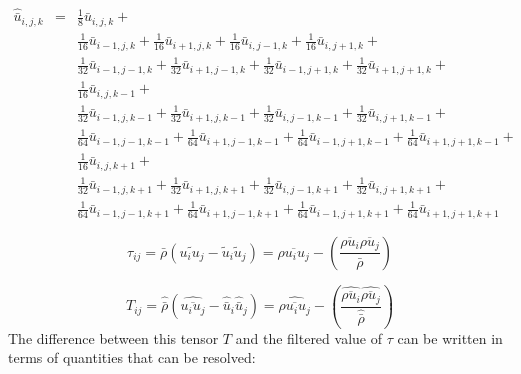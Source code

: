 \documentclass[12pt,titlepage]{article}
\begin{document}
{\setlength\arraycolsep{2pt}
\begin{eqnarray}
\hat{\bar{u}}_{i,j,k} & = & \frac{1}{8} \bar{u}_{i  ,j  ,k  }+{} \nonumber\\
              & & {}    \frac{1}{16}\bar{u}_{i-1,j  ,k  }+\frac{1}{16}\bar{u}_{i+1,j,  k  } +
                        \frac{1}{16}\bar{u}_{i  ,j-1,k  }+\frac{1}{16}\bar{u}_{i  ,j+1,k  } +{} \nonumber\\ 
	      & & {} 	\frac{1}{32}\bar{u}_{i-1,j-1,k  }+\frac{1}{32}\bar{u}_{i+1,j-1,k  } + 
	                \frac{1}{32}\bar{u}_{i-1,j+1,k  }+\frac{1}{32}\bar{u}_{i+1,j+1,k  } +{} \nonumber\\
  	      & & {}    \frac{1}{16}\bar{u}_{i,  j,  k-1}+ {} \nonumber\\                                     
	      & & {}    \frac{1}{32}\bar{u}_{i-1,j,  k-1}+\frac{1}{32}\bar{u}_{i+1,j,  k-1} +
	                \frac{1}{32}\bar{u}_{i,  j-1,k-1}+\frac{1}{32}\bar{u}_{i,  j+1,k-1} +{} \nonumber\\
	      & & {}    \frac{1}{64}\bar{u}_{i-1,j-1,k-1}+\frac{1}{64}\bar{u}_{i+1,j-1,k-1} +
	                \frac{1}{64}\bar{u}_{i-1,j+1,k-1}+\frac{1}{64}\bar{u}_{i+1,j+1,k-1} +{} \nonumber\\
	      & & {}    \frac{1}{16}\bar{u}_{i,  j,  k+1}+{} \nonumber\\
	      & & {}    \frac{1}{32}\bar{u}_{i-1,j,  k+1}+\frac{1}{32}\bar{u}_{i+1,j,  k+1} + 
	                \frac{1}{32}\bar{u}_{i,  j-1,k+1}+\frac{1}{32}\bar{u}_{i,  j+1,k+1} +{} \nonumber\\
	      & & {}    \frac{1}{64}\bar{u}_{i-1,j-1,k+1}+\frac{1}{64}\bar{u}_{i+1,j-1,k+1} +
	                \frac{1}{64}\bar{u}_{i-1,j+1,k+1}+\frac{1}{64}\bar{u}_{i+1,j+1,k+1}\nonumber
\end{eqnarray}}

\begin{displaymath}
\tau_{ij}=\bar{\rho}(\widetilde{u_i u_j}-\tilde{u}_i \tilde{u}_j)
        =\overline{\rho u_i u_j}-(\frac{\overline{\rho u_i} \overline{\rho u_j}}{\bar{\rho}})
\end{displaymath}

\begin{displaymath}
T_{ij} =\hat{\bar{\rho}}(\widehat{\overline{u_i u_j}}-\hat{\bar{u}}_i \hat{\bar{u}}_j)
       =\widehat{\overline{\rho u_i u_j}}- (\frac{\widehat{\overline{\rho u_i}}
\widehat{\overline{\rho u_j}}}{\hat{\bar{\rho}}})
\end{displaymath}
The difference between this tensor $T$ and the
filtered value of $\tau$ can be written in terms of quantities that can be resolved:
\end{document}

